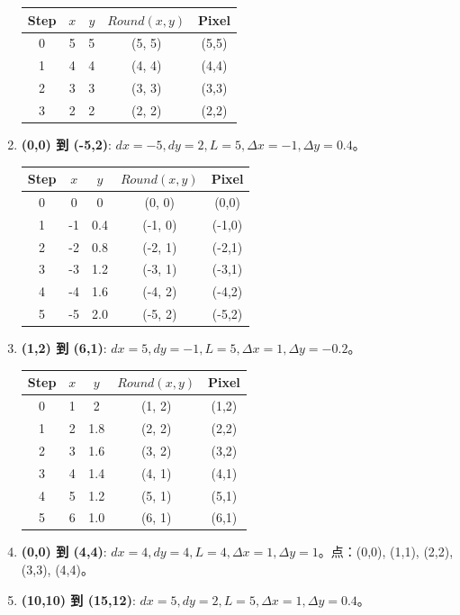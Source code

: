 \documentclass[UTF8]{ctexart}
\begin{document}
\begin{enumerate}
\begin{center}
\begin{tabular}{ccccc}
    \toprule Step & $x$ & $y$ & $Round(x,y)$ & Pixel \\ \midrule
    0 & 5 & 5 & (5, 5) & (5,5) \\
    1 & 4 & 4 & (4, 4) & (4,4) \\ 2 & 3 & 3 & (3, 3) & (3,3) \\
    3 & 2 & 2 & (2, 2) & (2,2) \\ \bottomrule
    \end{tabular}
    \end{center}
    \item \textbf{(0,0) 到 (-5,2)}: $dx=-5, dy=2, L=5, \Delta x=-1, \Delta y=0.4$。
    \begin{center}
    \begin{tabular}{ccccc}
    \toprule Step & $x$ & $y$ & $Round(x,y)$ & Pixel \\ \midrule
    0 & 0 & 0 & (0, 0) & (0,0) \\
    1 & -1 & 0.4 & (-1, 0) & (-1,0) \\ 2 & -2 & 0.8 & (-2, 1) & (-2,1) \\
    3 & -3 & 1.2 & (-3, 1) & (-3,1) \\ 4 & -4 & 1.6 & (-4, 2) & (-4,2) \\
    5 & -5 & 2.0 & (-5, 2) & (-5,2) \\ \bottomrule
    \end{tabular}
    \end{center}
    \item \textbf{(1,2) 到 (6,1)}: $dx=5, dy=-1, L=5, \Delta x=1, \Delta y=-0.2$。
    \begin{center}
    \begin{tabular}{ccccc}
    \toprule Step & $x$ & $y$ & $Round(x,y)$ & Pixel \\ \midrule
    0 & 1 & 2 & (1, 2) & (1,2) \\
    1 & 2 & 1.8 & (2, 2) & (2,2) \\ 2 & 3 & 1.6 & (3, 2) & (3,2) \\
    3 & 4 & 1.4 & (4, 1) & (4,1) \\ 4 & 5 & 1.2 & (5, 1) & (5,1) \\
    5 & 6 & 1.0 & (6, 1) & (6,1) \\ \bottomrule
    \end{tabular}
    \end{center}
    \item \textbf{(0,0) 到 (4,4)}: $dx=4, dy=4, L=4, \Delta x=1, \Delta y=1$。点：(0,0), (1,1), (2,2), (3,3), (4,4)。
    \item \textbf{(10,10) 到 (15,12)}: $dx=5, dy=2, L=5, \Delta x=1, \Delta y=0.4$。

\end{enumerate}
\end{document}
